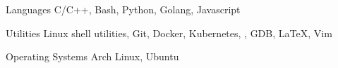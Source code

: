 
\vspace{-0.3cm}


\begin{cvskills}


  \cvskill
  {Languages}
  {C/C++, Bash, Python, Golang, Javascript}


  \cvskill
  {Utilities}
  {Linux shell utilities, Git, Docker, Kubernetes, , GDB, \LaTeX, Vim}


  \cvskill
  {Operating Systems}
  {Arch Linux, Ubuntu}


\end{cvskills}
